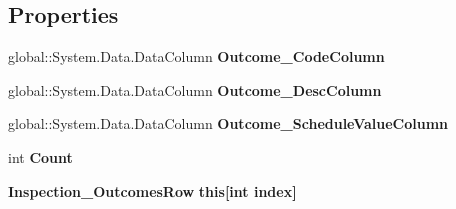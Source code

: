 \subsection*{Properties}
\begin{DoxyCompactItemize}
\item 
\mbox{\label{class_a_f_h___scheduler_1_1_home_inspection_db_data_set_1_1_inspection___outcomes_data_table_ae6140e3630ba7fca1ab8d531cea7a0e1}} 
global\+::\+System.\+Data.\+Data\+Column {\bfseries Outcome\+\_\+\+Code\+Column}\hspace{0.3cm}{\ttfamily  [get]}
\item 
\mbox{\label{class_a_f_h___scheduler_1_1_home_inspection_db_data_set_1_1_inspection___outcomes_data_table_a240e4e108d2aa83d554dd67afd206535}} 
global\+::\+System.\+Data.\+Data\+Column {\bfseries Outcome\+\_\+\+Desc\+Column}\hspace{0.3cm}{\ttfamily  [get]}
\item 
\mbox{\label{class_a_f_h___scheduler_1_1_home_inspection_db_data_set_1_1_inspection___outcomes_data_table_ae268a4487b2c4df6b71114d5a80f816c}} 
global\+::\+System.\+Data.\+Data\+Column {\bfseries Outcome\+\_\+\+Schedule\+Value\+Column}\hspace{0.3cm}{\ttfamily  [get]}
\item 
\mbox{\label{class_a_f_h___scheduler_1_1_home_inspection_db_data_set_1_1_inspection___outcomes_data_table_af80d91337b90e15f5a890a6aa63db627}} 
int {\bfseries Count}\hspace{0.3cm}{\ttfamily  [get]}
\item 
\mbox{\label{class_a_f_h___scheduler_1_1_home_inspection_db_data_set_1_1_inspection___outcomes_data_table_a535e3a50b356a0a838da25394a187c94}} 
\textbf{ Inspection\+\_\+\+Outcomes\+Row} {\bfseries this[int index]}\hspace{0.3cm}{\ttfamily  [get]}
\end{DoxyCompactItemize}
